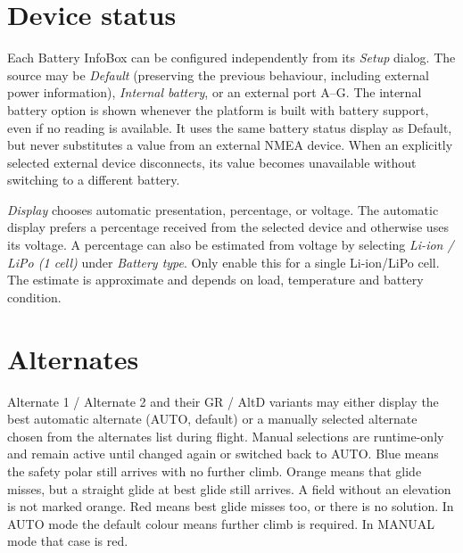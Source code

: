 \section{Device status}


Each Battery InfoBox can be configured independently from its \emph{Setup}
dialog. The source may be \emph{Default} (preserving the previous
behaviour, including external power information), \emph{Internal battery},
or an external port A--G. The internal battery option is shown whenever
the platform is built with battery support, even if no reading is available.
It uses the same battery status display as Default, but never substitutes
a value from an external NMEA device. When an explicitly selected external
device disconnects, its value becomes unavailable without switching to a
different battery.

\emph{Display} chooses automatic presentation, percentage, or voltage.
The automatic display prefers a percentage received from the selected
device and otherwise uses its voltage. A percentage can also be
estimated from voltage by selecting \emph{Li-ion / LiPo (1 cell)}
under \emph{Battery type}. Only enable this for a single Li-ion/LiPo
cell. The estimate is approximate and depends on load, temperature
and battery condition.

\section{Alternates}

Alternate 1 / Alternate 2 and their GR / AltD variants may either display the
best automatic alternate (AUTO, default) or a manually selected alternate
chosen from the alternates list during flight. Manual selections are
runtime-only and remain active until changed again or switched back to AUTO.
Blue means the safety polar still arrives with no further climb. Orange
means that glide misses, but a straight glide at best glide still arrives.
A field without an elevation is not marked orange.
Red means best glide misses too, or there is no solution. In AUTO mode the
default colour means further climb is required. In MANUAL mode that case
is red.


